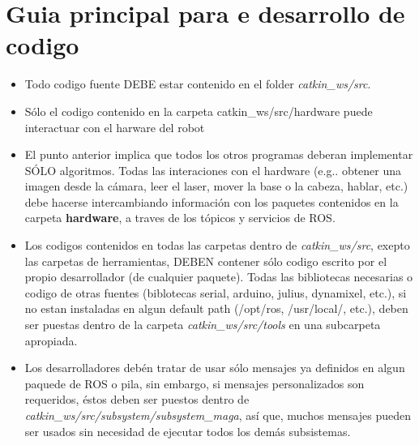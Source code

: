 \documentclass[a4paper,usenames,dvipsnames,svgnames,table]{book}
\begin{document}
\section{Guia principal para e desarrollo de codigo}
\begin{itemize}
 \item Todo codigo fuente DEBE estar contenido en el folder \textit{catkin\_ws/src}.\\
 
 \item Sólo el codigo contenido en la carpeta catkin\_ws/src/hardware puede interactuar con el 
 harware del robot\\
 
 \item El punto anterior implica que todos los otros programas deberan implementar SÓLO algoritmos. 
 Todas las interaciones con el hardware (e.g.. obtener una imagen desde la cámara, leer el laser, 
 mover la base o la cabeza, hablar, etc.) debe hacerse intercambiando información con los paquetes
 contenidos en la carpeta \textbf{hardware}, a traves de los tópicos y servicios de ROS.
 
 \item Los codigos contenidos en todas las carpetas dentro de \textit{catkin\_ws/src}, exepto las carpetas de 
 herramientas, DEBEN contener sólo codigo escrito por el propio desarrollador (de cualquier paquete).
 Todas las bibliotecas necesarias o codigo de otras fuentes (biblotecas serial, arduino, julius,
 dynamixel, etc.), si no estan instaladas en algun default path (/opt/ros, /usr/local/, etc.), deben 
 ser puestas dentro de la carpeta \textit{catkin\_ws/src/tools} en una subcarpeta apropiada.\\
 
 \item Los desarrolladores debén tratar de usar sólo mensajes ya definidos en algun paquede de ROS o
 pila, sin embargo, si mensajes personalizados son requeridos, éstos deben ser puestos dentro de
 \textit{catkin\_ws/src/subsystem/subsystem\_maga}, así que, muchos mensajes pueden ser usados sin necesidad
 de ejecutar todos los demás subsistemas.\\
\end{itemize}
\end{document}
